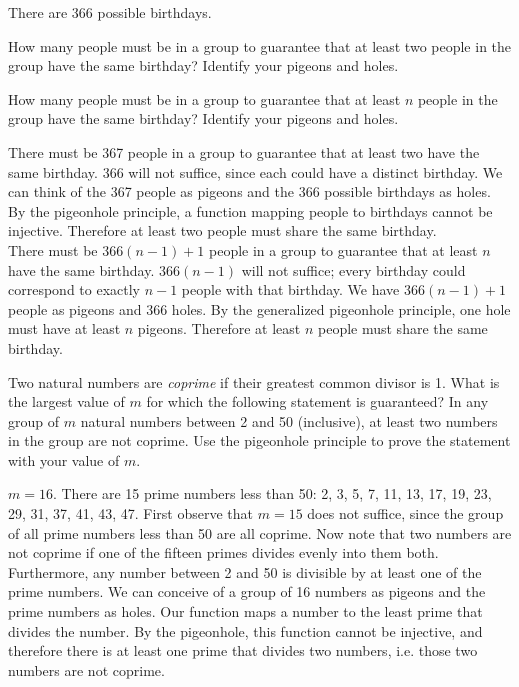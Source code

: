 \documentclass[solution, letterpaper]{cs20}
\begin{document}



There are 366 possible birthdays.

\subproblem How many people must be in a group to guarantee that at least two people in the group have the same birthday? Identify your pigeons and holes.

\subproblem How many people must be in a group to guarantee that at least $n$ people in the group have the same birthday? Identify your pigeons and holes.

\begin{solution}
  \subsolution There must be 367 people in a group to guarantee that at least two have the same birthday. 366 will not suffice, since each could have a distinct birthday. We can think of the 367 people as pigeons and the 366 possible birthdays as holes. By the pigeonhole principle, a function mapping people to birthdays cannot be injective. Therefore at least two people must share the same birthday. 
  \\
  \subsolution There must be $366(n-1) + 1$ people in a group to guarantee that at least $n$ have the same birthday. $366(n-1)$ will not suffice; every birthday could correspond to exactly $n-1$ people with that birthday. We have $366(n-1) + 1$ people as pigeons and 366 holes. By the generalized pigeonhole principle, one hole must have at least $n$ pigeons. Therefore at least $n$ people must share the same birthday.
\end{solution}


Two natural numbers are \textit{coprime} if their greatest common divisor is 1. What is the largest value of $m$ for which the following statement is guaranteed? In any group of $m$ natural numbers between 2 and 50 (inclusive), at least two numbers in the group are not coprime. Use the pigeonhole principle to prove the statement with your value of $m$. 

\begin{solution}

$m = 16$. There are 15 prime numbers less than 50: 2, 3, 5, 7, 11, 13, 17, 19, 23, 29, 31, 37, 41, 43, 47. First observe that $m = 15$ does not suffice, since the group of all prime numbers less than 50 are all coprime. Now note that two numbers are not coprime if one of the fifteen primes divides evenly into them both. Furthermore, any number between 2 and 50 is divisible by at least one of the prime numbers. We can conceive of a group of 16 numbers as pigeons and the prime numbers as holes. Our function maps a number to the least prime that divides the number. By the pigeonhole, this function cannot be injective, and therefore there is at least one prime that divides two numbers, i.e. those two numbers are not coprime.

\end{solution}
\end{document}
